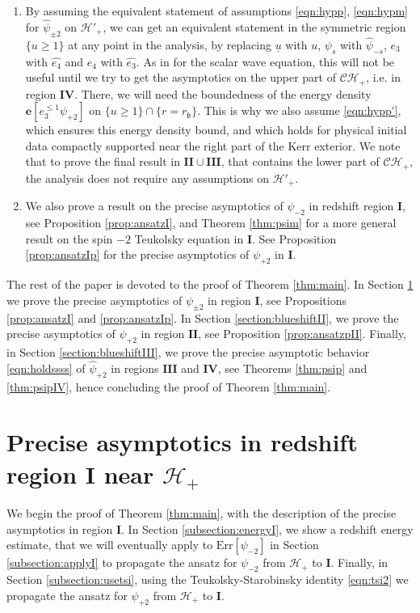\documentclass[reqno]{amsart}
\numberwithin{equation}{section}
\newcommand{\quatre}{\mathbf{IV}}
\newcommand{\mch}{\mathcal{H}}
\newcommand{\mcq}{\mathcal{Q}}
\newcommand{\ubar}{{\underline{u}}}
\newcommand{\errm}{\mathrm{Err}[\Psim]}
\newcommand{\carterp}{\mcq_{+2}}
\newcommand{\ch}{\mathcal{CH_+}}
\newcommand{\ener}{\mathbf{e}}
\newcommand{\Psihat}{\widehat{\psi}}
\newcommand{\psihat}{\widehat{\psi}}
\newcommand{\ethat}{\widehat{e_3}}
\newcommand{\eqhat}{\widehat{e_4}}
\newcommand{\un}{\mathbf{I}}
\newcommand{\deux}{\mathbf{II}}
\newcommand{\trois}{\mathbf{III}}
\newcommand{\rb}{r_\mathfrak{b}}
\newcommand{\Psip}{\psi_{+2}}
\newcommand{\psip}{\psi_{+2}}
\newcommand{\Psim}{\psi_{-2}}
\newcommand{\psim}{\psi_{-2}}
\newcommand{\Psihatp}{\Psihat_{+2}}
\theoremstyle{plain}
\theoremstyle{definition}
\theoremstyle{remark}
\numberwithin{equation}{section}
\begin{document}
\begin{rem}
\begin{enumerate}
        derivatives decay on the event horizon leads to an asymptotic \eqref{eqn:holdssss} that holds for higher order $T$, $\carterp$, and $\Phi$ derivatives. 
        \item By assuming the equivalent statement of assumptions \eqref{eqn:hypp}, \eqref{eqn:hypm} for $\psihat_{\pm 2}$ on $\mch'_+$, we can get an equivalent statement in the symmetric region $\{u\geq 1\}$ at any point in the analysis, by replacing $\ubar$ with $u$, $\psi_s$ with $\psihat_{-s}$, $e_3$ with $\eqhat$ and $e_4$ with $\ethat$. As in \cite{scalarMZ} for the scalar wave equation, this will not be useful until we try to get the asymptotics on the upper part of $\ch$, i.e. in region $\quatre$. There, we will need the boundedness of the energy density $\ener[e_3^{\leq 1}\psip]$ on $\{u\geq 1\}\cap\{r=\rb\}$. This is why we also assume \eqref{eqn:hypp'}, which ensures this energy density bound, and which holds for physical initial data compactly supported near the right part of the Kerr exterior. We note that to prove the final result in $\deux\cup\trois$, that contains the lower part of $\ch$, the analysis does not require any assumptions on $\mathcal{H}'_+$.
        \item We also prove a result on the precise asymptotics of $\psi_{- 2}$ in redshift region $\un$, see Proposition \ref{prop:ansatzI}, and Theorem \ref{thm:psim} for a more general result on the spin $-2$ Teukolsky equation in $\un$. See Proposition \ref{prop:ansatzIp} for the precise asymptotics of $\Psip$ in $\un$.

    \end{enumerate}
\end{rem}
The rest of the paper is devoted to the proof of Theorem \ref{thm:main}. In Section \ref{section:redshift} we prove the precise asymptotics of $\psi_{\pm 2}$ in region $\un$, see Propositions \ref{prop:ansatzI} and \ref{prop:ansatzIp}. In Section \ref{section:blueshiftII}, we prove the precise asymptotics of $\Psip$ in region $\deux$, see Proposition \ref{prop:ansatzpII}. Finally, in Section \ref{section:blueshiftIII}, we prove the precise asymptotic behavior \eqref{eqn:holdssss} of $\Psihatp$ in regions $\trois$ and $\quatre$, see Theorems \ref{thm:psip} and \ref{thm:psipIV}, hence concluding the proof of Theorem \ref{thm:main}.

\section{Precise asymptotics in redshift region $\mathbf{I}$ near $\mch_+$}\label{section:redshift}
We begin the proof of Theorem \ref{thm:main}, with the description of the precise asymptotics in region $\un$. In Section \ref{subsection:energyI}, we show a redshift energy estimate, that we will eventually apply to $\errm$ in Section \ref{subsection:applyI} to propagate the ansatz for $\psim$ from $\mch_+$ to $\un$. Finally, in Section \ref{subsection:usetsi}, using the Teukolsky-Starobinsky identity \eqref{eqn:tsi2} we propagate the ansatz for $\psip$ from $\mch_+$ to $\un$.
\end{document}

